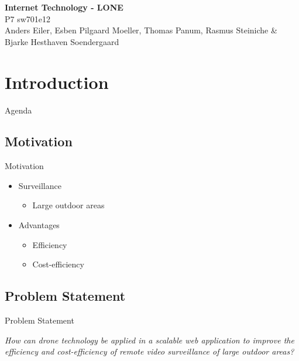 \author{Rasmus Steiniche}
\begin{frame}{}
	\begin{center}
		\huge \textbf{Internet Technology - LONE}\\
		\normalsize P7 sw701e12\\
		\tiny{Anders Eiler, Esben Pilgaard Moeller, Thomas Panum,}
		\tiny{Rasmus Steiniche \& Bjarke Hesthaven Soendergaard}
	\end{center}
\end{frame}

\section{Introduction}
\begin{frame}{Agenda}{}
\tableofcontents
\end{frame}

\subsection{Motivation}
\begin{frame}{Motivation}
\begin{itemize}
	\item Surveillance
	\begin{itemize}
		\item Large outdoor areas
	\end{itemize}
	\item Advantages
	\begin{itemize}
		\item Efficiency
		\item Cost-efficiency
	\end{itemize}
\end{itemize}
\end{frame}

\subsection{Problem Statement}
\begin{frame}{Problem Statement}
\begin{center}
	\textit{How can drone technology be applied in a scalable web application to improve the efficiency and cost-efficiency of remote video surveillance of large outdoor areas?}
\end{center}
\end{frame}